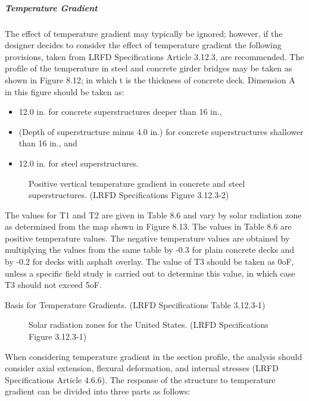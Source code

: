 \subparagraph{Temperature Gradient}
The effect of temperature gradient may typically be ignored; however, if the designer decides to consider the
effect of temperature gradient the following provisions, taken from LRFD Specifications Article 3.12.3, are
recommended. The profile of the temperature in steel and concrete girder bridges may be taken as shown in Figure
8.12; in which t is the thickness of concrete deck. Dimension A in this figure should be taken as:

\begin{itemize}
  \item 12.0 in. for concrete superstructures deeper than 16 in.,
  \item (Depth of superstructure minus 4.0 in.) for concrete superstructures shallower than 16 in., and
  \item 12.0 in. for steel superstructures.
\end{itemize}

\begin{figure}
  \caption{Positive vertical temperature gradient in concrete and steel superstructures. (LRFD Specifications Figure
  3.12.3-2)}\label{fig:vertical-temperature-gradient}
\end{figure}

The values for T1 and T2 are given in Table 8.6 and vary by solar radiation zone as determined from the map
shown in Figure 8.13. The values in Table 8.6 are positive temperature values. The negative temperature values are
obtained by multiplying the values from the same table by -0.3 for plain concrete decks and by -0.2 for decks with
asphalt overlay. The value of T3 should be taken as 0oF, unless a specific field study is carried out to determine this
value, in which case T3 should not exceed 5oF.

\begin{table}
  \caption{Basis for Temperature Gradients. (LRFD Specifications Table 3.12.3-1)}\label{tab:basis-temperature}
\end{table}

\begin{figure}
  \caption{Solar radiation zones for the United States. (LRFD Specifications Figure 3.12.3-1)}\label{fig:solar-radiation-zone}
\end{figure}

When considering temperature gradient in the section profile, the analysis should consider axial extension,
flexural deformation, and internal stresses (LRFD Specifications Article 4.6.6). The response of the structure to
temperature gradient can be divided into three parts as follows:


